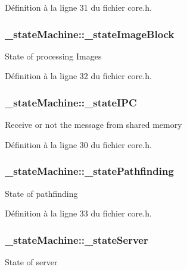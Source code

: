 Définition à la ligne 31 du fichier core.\-h.

\hypertarget{struct__state_machine_adbc0e51d4bed9b6da5c44e921e37dc32}{
\subsubsection[{\-\_\-state\-Image\-Block}]{ \-\_\-state\-Machine\-::\-\_\-state\-Image\-Block}}\label{struct__state_machine_adbc0e51d4bed9b6da5c44e921e37dc32}
State of processing Images 

Définition à la ligne 32 du fichier core.\-h.

\hypertarget{struct__state_machine_aa6cc70d0567b403fb9e993a681f48b85}{
\subsubsection[{\-\_\-state\-I\-P\-C}]{ \-\_\-state\-Machine\-::\-\_\-state\-I\-P\-C}}\label{struct__state_machine_aa6cc70d0567b403fb9e993a681f48b85}
Receive or not the message from shared memory 

Définition à la ligne 30 du fichier core.\-h.

\hypertarget{struct__state_machine_a79ce614ae01c3759d155c03026384ca7}{
\subsubsection[{\-\_\-state\-Pathfinding}]{ \-\_\-state\-Machine\-::\-\_\-state\-Pathfinding}}\label{struct__state_machine_a79ce614ae01c3759d155c03026384ca7}
State of pathfinding 

Définition à la ligne 33 du fichier core.\-h.

\hypertarget{struct__state_machine_aaee24e4ab99a6f1243a46645188de8d0}{
\subsubsection[{\-\_\-state\-Server}]{ \-\_\-state\-Machine\-::\-\_\-state\-Server}}\label{struct__state_machine_aaee24e4ab99a6f1243a46645188de8d0}
State of server 

